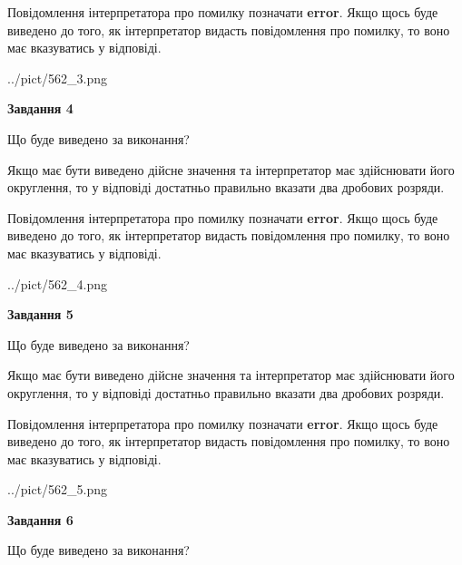 \documentclass[12pt, ukrainian]{article}
\begin{document}
{\begin {Large}
Повідомлення інтерпретатора про помилку позначати \textbf{error}.
Якщо щось буде виведено до того, як інтерпретатор видасть повідомлення про помилку, 
то воно має вказуватись у відповіді. \par

\begin{center}
	{../pict/562_3.png}
\end{center}
\newpage

{\begin {center}\textbf{Завдання 4}\end {center}}\par
Що буде виведено за виконання? \par

Якщо має бути виведено дійсне значення та інтерпретатор має здійснювати його округлення, 
то у відповіді достатньо правильно вказати два дробових розряди.

Повідомлення інтерпретатора про помилку позначати \textbf{error}.
Якщо щось буде виведено до того, як інтерпретатор видасть повідомлення про помилку, 
то воно має вказуватись у відповіді. \par

\begin{center}
	{../pict/562_4.png}
\end{center}
\newpage

{\begin {center}\textbf{Завдання 5}\end {center}}\par
Що буде виведено за виконання? \par

Якщо має бути виведено дійсне значення та інтерпретатор має здійснювати його округлення, 
то у відповіді достатньо правильно вказати два дробових розряди.

Повідомлення інтерпретатора про помилку позначати \textbf{error}.
Якщо щось буде виведено до того, як інтерпретатор видасть повідомлення про помилку, 
то воно має вказуватись у відповіді. \par

\begin{center}
	{../pict/562_5.png}
\end{center}
\newpage

{\begin {center}\textbf{Завдання 6}\end {center}}\par
Що буде виведено за виконання? \par


\end{Large}}
\end{document}
